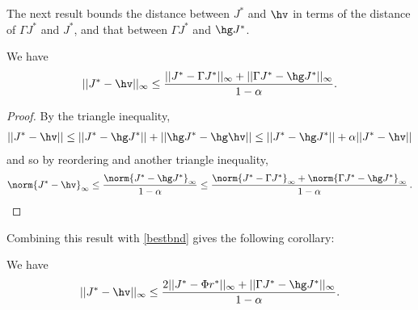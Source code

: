 The next result bounds the distance between $J^*$ and $\hv$ in terms of the distance of $\Gamma J^*$ and $J^*$, and that between $\Gamma J^*$ and $\hg J^*$.
\begin{theorem}\label{mt1}
We have
\begin{align}
||J^*-\hv||_\infty\leq \frac{||J^*-\Gamma J^*||_\infty+||\Gamma J^*-\hg J^*||_\infty}{1-\alpha}.
\end{align}
\end{theorem}
\begin{proof}
By the triangle inequality,
\begin{align}
||J^*-\hv||\leq ||J^*-\hg J^*||+||\hg J^*-\hg \hv||\leq ||J^*-\hg J^*||+\alpha || J^*- \hv||
\end{align}
and so by reordering and another triangle inequality,
\begin{align*}
\norm{J^*-\hv}_{\infty} \le \frac{\norm{ J^*-\hg J^*}_{\infty}}{1-\alpha}
\le \frac{\norm{ J^*-\Gamma J^*}_{\infty}+\norm{\Gamma J^* - \hg J^*}_{\infty}}{1-\alpha}\,.
\end{align*}
\end{proof}
\noindent Combining this result with \cref{bestbnd} gives the following corollary:
\begin{corollary}\label{cmt1}
We have
\begin{align}
||J^*-\hv||_\infty\leq \frac{2||J^*-\Phi r^*||_\infty+||\Gamma J^*-\hg J^*||_\infty}{1-\alpha}.
\end{align}
\end{corollary}
